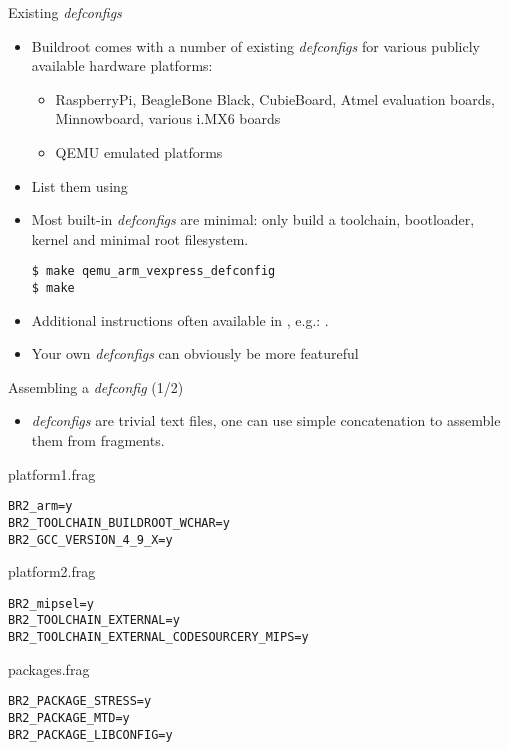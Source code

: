 \begin{frame}[fragile]{Existing {\em defconfigs}}

  \begin{itemize}

  \item Buildroot comes with a number of existing {\em defconfigs} for
    various publicly available hardware platforms:
    \begin{itemize}
    \item RaspberryPi, BeagleBone Black, CubieBoard, Atmel evaluation
      boards, Minnowboard, various i.MX6 boards
    \item QEMU emulated platforms
    \end{itemize}
  \item List them using 
  \item Most built-in {\em defconfigs} are minimal: only build a
    toolchain, bootloader, kernel and minimal root filesystem.
    \begin{block}{}
\begin{verbatim}
$ make qemu_arm_vexpress_defconfig
$ make
\end{verbatim}
\end{block}

\item Additional instructions often available in
  , e.g.: .
\item Your own {\em defconfigs} can obviously be more featureful
  \end{itemize}
\end{frame}

\begin{frame}[fragile]{Assembling a {\em defconfig} (1/2)}

  \begin{itemize}
  \item {\em defconfigs} are trivial text files, one can use simple
    concatenation to assemble them from fragments.
  \end{itemize}

{\small
   \begin{block}{platform1.frag}
\begin{verbatim}
BR2_arm=y
BR2_TOOLCHAIN_BUILDROOT_WCHAR=y
BR2_GCC_VERSION_4_9_X=y
\end{verbatim}
   \end{block}
}

{\small
    \begin{block}{platform2.frag}
\begin{verbatim}
BR2_mipsel=y
BR2_TOOLCHAIN_EXTERNAL=y
BR2_TOOLCHAIN_EXTERNAL_CODESOURCERY_MIPS=y
\end{verbatim}
    \end{block}
}

{\small
   \begin{block}{packages.frag}
\begin{verbatim}
BR2_PACKAGE_STRESS=y
BR2_PACKAGE_MTD=y
BR2_PACKAGE_LIBCONFIG=y
\end{verbatim}
   \end{block}
}

\end{frame}

